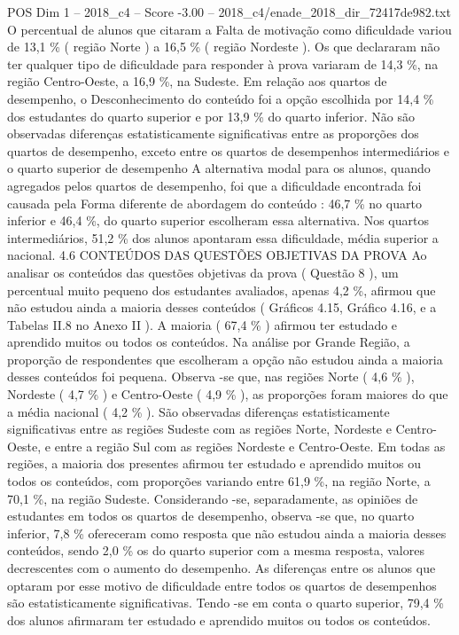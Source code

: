 \begin{textsample}{POS Dim 1 – 2018\_c4 – Score -3.00 – 2018\_c4/enade\_2018\_dir\_72417de982.txt}
O percentual de alunos que citaram a Falta de motivação como dificuldade variou de 13,1 \% ( região Norte ) a 16,5 \% ( região Nordeste ).
Os que declararam não ter qualquer tipo de dificuldade para responder à prova variaram de 14,3 \%, na região Centro-Oeste, a 16,9 \%, na Sudeste.
Em relação aos quartos de desempenho, o Desconhecimento do conteúdo foi a opção escolhida por 14,4 \% dos estudantes do quarto superior e por 13,9 \% do quarto inferior.
Não são observadas diferenças estatisticamente significativas entre as proporções dos quartos de desempenho, exceto entre os quartos de desempenhos intermediários e o quarto superior de desempenho A alternativa modal para os alunos, quando agregados pelos quartos de desempenho, foi que a dificuldade encontrada foi causada pela Forma diferente de abordagem do conteúdo : 46,7 \% no quarto inferior e 46,4 \%, do quarto superior escolheram essa alternativa.
Nos quartos intermediários, 51,2 \% dos alunos apontaram essa dificuldade, média superior a nacional. 4.6 CONTEÚDOS DAS QUESTÕES OBJETIVAS DA PROVA Ao analisar os conteúdos das questões objetivas da prova ( Questão 8 ), um percentual muito pequeno dos estudantes avaliados, apenas 4,2 \%, afirmou que não estudou ainda a maioria desses conteúdos ( Gráficos 4.15, Gráfico 4.16, e a Tabelas II.8 no Anexo II ).
A maioria ( 67,4 \% ) afirmou ter estudado e aprendido muitos ou todos os conteúdos.
Na análise por Grande Região, a proporção de respondentes que escolheram a opção não estudou ainda a maioria desses conteúdos foi pequena.
Observa -se que, nas regiões Norte ( 4,6 \% ), Nordeste ( 4,7 \% ) e Centro-Oeste ( 4,9 \% ), as proporções foram maiores do que a média nacional ( 4,2 \% ).
São observadas diferenças estatisticamente significativas entre as regiões Sudeste com as regiões Norte, Nordeste e Centro-Oeste, e entre a região Sul com as regiões Nordeste e Centro-Oeste.
Em todas as regiões, a maioria dos presentes afirmou ter estudado e aprendido muitos ou todos os conteúdos, com proporções variando entre 61,9 \%, na região Norte, a 70,1 \%, na região Sudeste.
Considerando -se, separadamente, as opiniões de estudantes em todos os quartos de desempenho, observa -se que, no quarto inferior, 7,8 \% ofereceram como resposta que não estudou ainda a maioria desses conteúdos, sendo 2,0 \% os do quarto superior com a mesma resposta, valores decrescentes com o aumento do desempenho.
As diferenças entre os alunos que optaram por esse motivo de dificuldade entre todos os quartos de desempenhos são estatisticamente significativas.
Tendo -se em conta o quarto superior, 79,4 \% dos alunos afirmaram ter estudado e aprendido muitos ou todos os conteúdos.

\end{textsample}
